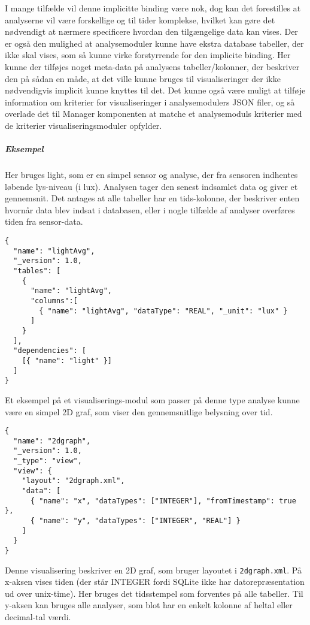 I mange tilfælde vil denne implicitte binding være nok, dog kan det forestilles at analyserne vil være forskellige og til tider komplekse, hvilket kan gøre det nødvendigt at nærmere specificere hvordan den tilgængelige data kan vises.
Der er også den mulighed at analysemoduler kunne have ekstra database tabeller, der ikke skal vises, som så kunne virke forstyrrende for den implicite binding.
Her kunne der tilføjes noget meta-data på analysens tabeller/kolonner, der beskriver den på sådan en måde, at det ville kunne bruges til visualiseringer der ikke nødvendigvis implicit kunne knyttes til det.
Det kunne også være muligt at tilføje information om kriterier for visualiseringer i analysemodulers JSON filer, og så overlade det til Manager komponenten at matche et analysemoduls kriterier med de kriterier visualiseringsmoduler opfylder.

\subparagraph{Eksempel}
Her bruges light, som er en simpel sensor og analyse, der fra sensoren indhentes løbende lys-niveau (i lux).
Analysen tager den senest indsamlet data og giver et gennemsnit.
Det antages at alle tabeller har en tids-kolonne, der beskriver enten hvornår data blev indsat i databasen, eller i nogle tilfælde af analyser overføres tiden fra sensor-data.

\begin{lstlisting}
{
  "name": "lightAvg",
  "_version": 1.0,
  "tables": [
    {
      "name": "lightAvg",
      "columns":[
        { "name": "lightAvg", "dataType": "REAL", "_unit": "lux" }
      ]
    }
  ],
  "dependencies": [
    [{ "name": "light" }]
  ]
}
\end{lstlisting}

Et eksempel på et visualiserings-modul som passer på denne type analyse kunne være en simpel 2D graf, som viser den gennemsnitlige belysning over tid.

\begin{lstlisting}
{
  "name": "2dgraph",
  "_version": 1.0,
  "_type": "view",
  "view": {
    "layout": "2dgraph.xml",
    "data": [
      { "name": "x", "dataTypes": ["INTEGER"], "fromTimestamp": true },
      { "name": "y", "dataTypes": ["INTEGER", "REAL"] }
    ]
  }
}
\end{lstlisting}
 
Denne visualisering beskriver en 2D graf, som bruger layoutet i \texttt{2dgraph.xml}.
På x-aksen vises tiden (der står INTEGER fordi SQLite ikke har datorepræsentation ud over unix-time).
Her bruges det tidsstempel som forventes på alle tabeller.
Til y-aksen kan bruges alle analyser, som blot har en enkelt kolonne af heltal eller decimal-tal værdi.

